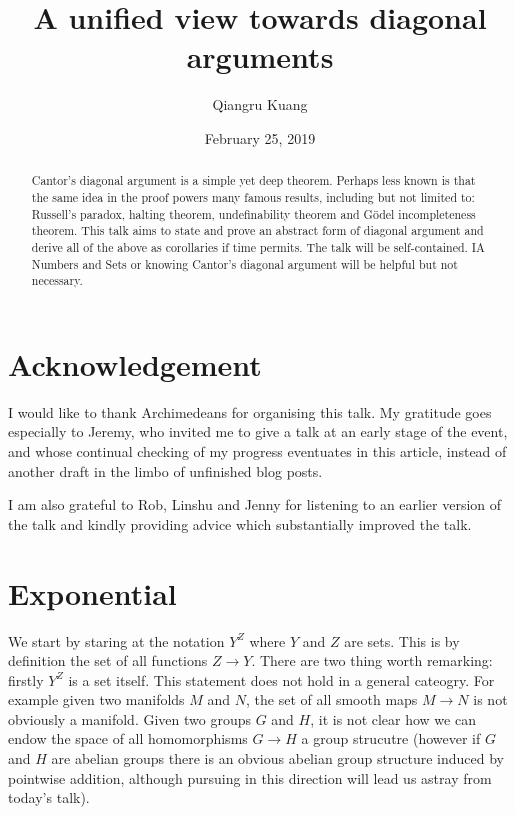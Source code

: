 \documentclass[a4paper]{article}
\title{A unified view towards diagonal arguments}
\author{Qiangru Kuang}
\date{February 25, 2019}
\begin{document}
\maketitle

\begin{abstract}
  Cantor's diagonal argument is a simple yet deep theorem. Perhaps less known is that the same idea in the proof powers many famous results, including but not limited to: Russell's paradox, halting theorem, undefinability theorem and Gödel incompleteness theorem. This talk aims to state and prove an abstract form of diagonal argument and derive all of the above as corollaries if time permits. The talk will be self-contained. IA Numbers and Sets or knowing Cantor's diagonal argument will be helpful but not necessary.
\end{abstract}

\section{Acknowledgement}

I would like to thank Archimedeans for organising this talk. My gratitude goes especially to Jeremy, who invited me to give a talk at an early stage of the event, and whose continual checking of my progress eventuates in this article, instead of another draft in the limbo of unfinished blog posts.

I am also grateful to Rob, Linshu and Jenny for listening to an earlier version of the talk and kindly providing advice which substantially improved the talk.

\section{Exponential}

We start by staring at the notation \(Y^Z\) where \(Y\) and \(Z\) are sets. This is by definition the set of all functions \(Z \to Y\). There are two thing worth remarking: firstly \(Y^Z\) is a set itself. This statement does not hold in a general cateogry. For example given two manifolds \(M\) and \(N\), the set of all smooth maps \(M \to N\) is not obviously a manifold. Given two groups \(G\) and \(H\), it is not clear how we can endow the space of all homomorphisms \(G \to H\) a group strucutre (however if \(G\) and \(H\) are abelian groups there is an obvious abelian group structure induced by pointwise addition, although pursuing in this direction will lead us astray from today's talk).
\end{document}
